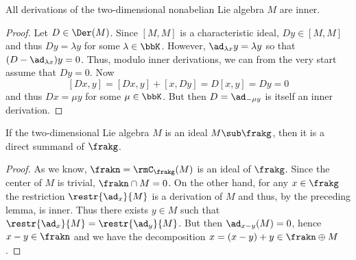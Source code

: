 \begin{lem}
    All derivations of the two-dimensional nonabelian Lie algebra $M$ are inner.
\end{lem}
\begin{proof}
    Let $D\in\Der(M)$. Since $[M,M]$ is a characteristic ideal, $Dy\in[M,M]$ and thus $Dy=\lambda y$ for some $\lambda\in\bbK$. However, $\ad_{\lambda x}y=\lambda y$ so that $(D-\ad_{\lambda x})y=0$. Thus, modulo inner derivations, we can from the very start assume that $Dy=0$. Now
    \[[Dx,y]=[Dx,y]+[x,Dy]=D[x,y]=Dy=0\]
    and thus $Dx=\mu y$ for some $\mu\in\bbK$. But then $D=\ad_{-\mu y}$ is itself an inner derivation.
\end{proof}

\begin{lem}\label{lem 2}
    If the two-dimensional Lie algebra $M$ is an ideal $M\sub \frakg$, then it is a direct summand of $\frakg$.
\end{lem}
\begin{proof}
    As we know, $\frakn=\rmC_\frakg(M)$ is an ideal of $\frakg$. Since the center of $M$ is trivial, $\frakn\cap M=0$. On the other hand, for any $x\in\frakg$ the restriction $\restr{\ad_x}{M}$ is a derivation of $M$ and thus, by the preceding lemma, is inner. Thus there exists $y\in M$ such that $\restr{\ad_x}{M}=\restr{\ad_y}{M}$. But then $\ad_{x-y}(M)=0$, hence $x-y\in \frakn$ and we have the decomposition $x=(x-y)+y\in \frakn\oplus M$.
\end{proof}



